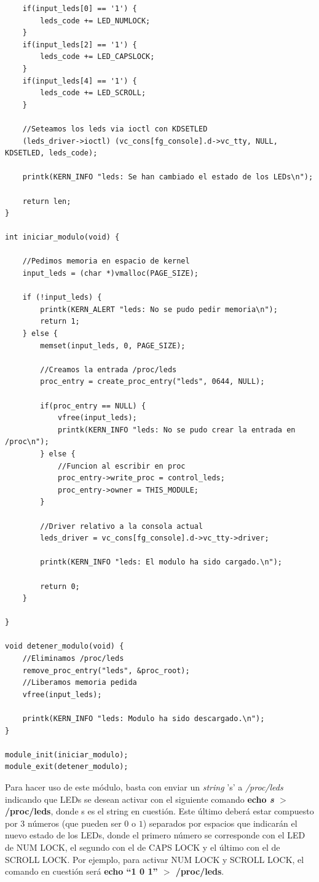 \documentclass[a4paper,11pt] {article}
\begin{document}
\begin{enumerate}
\begin{verbatim}
    if(input_leds[0] == '1') {
        leds_code += LED_NUMLOCK;
    }
    if(input_leds[2] == '1') {
        leds_code += LED_CAPSLOCK;
    }
    if(input_leds[4] == '1') {
        leds_code += LED_SCROLL;
    }
    
    //Seteamos los leds via ioctl con KDSETLED
    (leds_driver->ioctl) (vc_cons[fg_console].d->vc_tty, NULL, KDSETLED, leds_code);
    
    printk(KERN_INFO "leds: Se han cambiado el estado de los LEDs\n");
    
    return len;
}

int iniciar_modulo(void) {

    //Pedimos memoria en espacio de kernel
    input_leds = (char *)vmalloc(PAGE_SIZE);
    
    if (!input_leds) {
        printk(KERN_ALERT "leds: No se pudo pedir memoria\n");
        return 1;
    } else {
        memset(input_leds, 0, PAGE_SIZE);

        //Creamos la entrada /proc/leds
        proc_entry = create_proc_entry("leds", 0644, NULL);

        if(proc_entry == NULL) {
            vfree(input_leds);
            printk(KERN_INFO "leds: No se pudo crear la entrada en /proc\n");
        } else {
            //Funcion al escribir en proc
            proc_entry->write_proc = control_leds; 
            proc_entry->owner = THIS_MODULE;
        }

        //Driver relativo a la consola actual
        leds_driver = vc_cons[fg_console].d->vc_tty->driver;
        
        printk(KERN_INFO "leds: El modulo ha sido cargado.\n");
    
        return 0;
    }
    
}

void detener_modulo(void) {
    //Eliminamos /proc/leds
    remove_proc_entry("leds", &proc_root);
    //Liberamos memoria pedida
    vfree(input_leds);

    printk(KERN_INFO "leds: Modulo ha sido descargado.\n");
}

module_init(iniciar_modulo);
module_exit(detener_modulo);
	\end{verbatim}

	Para hacer uso de este módulo, basta con enviar un \textit{string} 's'  a \textit{/proc/leds} indicando que LEDs se desean activar con el siguiente comando \textbf{echo \textit{s} $>$ /proc/leds}, donde s es el string en cuestión. Este último deberá estar compuesto por 3 números (que pueden ser $0$ o $1$) separados por espacios que indicarán el nuevo estado de los LEDs, donde el primero número se corresponde con el LED de NUM LOCK, el segundo con el de CAPS LOCK y el último con el de SCROLL LOCK. Por ejemplo, para activar NUM LOCK y SCROLL LOCK, el comando en cuestión será \textbf{echo ``1 0 1'' $>$ /proc/leds}.

\end{enumerate}
\end{document}
